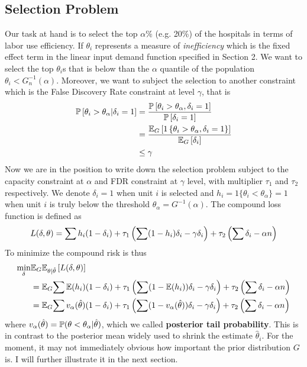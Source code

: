 \documentclass[12pt]{article}
\begin{document}
\subsection{Selection Problem}
Our task at hand is to select the top $\alpha\%$ (e.g. 20\%) of the hospitals
in terms of labor use efficiency. If $\theta_i$ represents a measure of
\emph{inefficiency} which is the fixed effect term in the linear input demand
function specified in Section 2. We want to select the top $\theta_i$s that is
below than the $\alpha$ quantile of the population $\theta_i<G_n^{-1}(\alpha)$.
Moreover, we want to subject the selection to another constraint which is the
False Discovery Rate constraint at level $\gamma$, that is
\begin{align*}
    \mathbb{P}\left[\theta_i>\theta_{\alpha}|\delta_i=1\right] & =\frac{\mathbb{P}\left[\theta_i>\theta_{\alpha},\delta_i=1\right]}{\mathbb{P}\left[\delta_i=1\right]}           \\
                                                & = \frac{\mathbb{E}_G\left[1\left\{\theta_i>\theta_{\alpha},\delta_i=1\right\}\right]}{\mathbb{E}_G\left[\delta_i\right]} \\
                                                & \le \gamma                                                                        \\
\end{align*}
Now we are in the position to write down the selection problem subject to the
capacity constraint at $\alpha$ and FDR constraint at $\gamma$ level, with multiplier $\tau_1$ and $\tau_2$ respectively. We denote
$\delta_i=1$ when unit $i$ is selected and $h_i=1\{\theta_i<\theta_\alpha\}=1$ when unit $i$ is truly below
the threshold $\theta_\alpha =G^{-1}(\alpha)$. The compound loss
function is defined as
\begin{equation*}
    L(\delta,\theta)=\sum h_i(1-\delta_i) +\tau_1\left(\sum (1-h_i)\delta_i -\gamma \delta_i\right) + \tau_2 \left(\sum \delta_i -\alpha n\right)
\end{equation*}
To minimize the compound risk is thus
\begin{align*}
    \min_{\delta} & \mathbb{E}_G\mathbb{E}_{\theta|\hat{\theta}}\left[L(\delta,\theta)\right]                                                                                                        \\
                  & =\mathbb{E}_G{\sum \mathbb{E}(h_i)(1-\delta_i) +\tau_1\left(\sum (1-\mathbb{E}(h_i))\delta_i -\gamma \delta_i\right) + \tau_2 \left(\sum \delta_i -\alpha n\right)}                               \\
                  & =\mathbb{E}_G{\sum v_\alpha(\hat{\theta})(1-\delta_i) +\tau_1\left(\sum (1-v_\alpha(\hat{\theta}))\delta_i -\gamma \delta_i\right) + \tau_2 \left(\sum \delta_i -\alpha n\right)} \\
\end{align*}
where $v_\alpha(\hat{\theta})=\mathbb{P}(\theta<\theta_\alpha|\hat{\theta})$, which we called \textbf{posterior tail probability}. This is in contrast to the posterior mean widely used to shrink the estimate $\hat{\theta}_i$.
For the moment, it may not immediately obvious how important the prior distribution $G$ is. I will further illustrate it in the next section.
\end{document}
